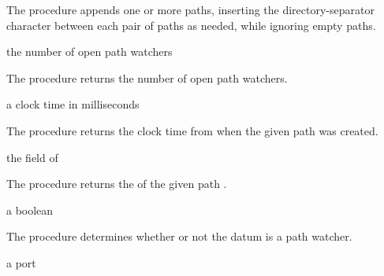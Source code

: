 The  procedure appends one or more paths, inserting
the directory-separator character between each pair of paths as
needed, while ignoring empty paths.


\begin{procedure}
\end{procedure}
\returns{} the number of open path watchers

The  procedure returns the number of open
path watchers.

\begin{procedure}
\end{procedure}
\returns{} a clock time in milliseconds

The  procedure returns the clock time
from  when the given path  was created.

\begin{procedure}
\end{procedure}
\returns{} the  field of 

The  procedure returns the  of the
given path .

\begin{procedure}
\end{procedure}
\returns{} a boolean

The  procedure determines whether or not the datum
 is a path watcher.

\begin{procedure}
\end{procedure}
\returns{} a port

